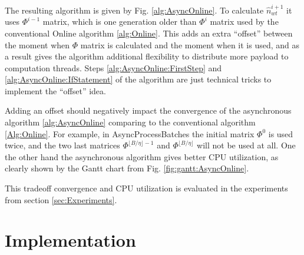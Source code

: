 \documentclass[russian,english]{llncs}
\newcommand{\kw}[1]{\textsf{#1}}
\begin{document}
The resulting algorithm is given by Fig. \ref{alg:AsyncOnline}.
To calculate $\hat n^{i+1}_{wt}$ it uses $\Phi^{i-1}$ matrix,
which is one generation older than $\Phi^{i}$ matrix used by the conventional \kw{Online algorithm} \ref{alg:Online}.
This adds an extra ``offset'' between the moment when $\Phi$ matrix is calculated and the moment when it is used,
and as a result gives the algorithm additional flexibility to distribute more payload to computation threads.
Steps \ref{alg:AsyncOnline:FirstStep} and \ref{alg:AsyncOnline:IfStatement} of the algorithm
are just technical tricks to implement the ``offset'' idea.

Adding an offset should negatively impact the convergence of the asynchronous algorithm \ref{alg:AsyncOnline}
comparing to the conventional algorithm \ref{Alg:Online}.
For example, in \kw{AsyncProcessBatches} the initial matrix $\Phi^0$ is used twice,
and the two last matrices $\Phi^{\lfloor B / \eta \rfloor - 1}$ and $\Phi^{\lfloor B / \eta \rfloor}$ will not be used at all.
One the other hand the asynchronous algorithm gives better CPU utilization,
as clearly shown by the Gantt chart from Fig. \ref{fig:gantt:AsyncOnline}.

This tradeoff convergence and CPU utilization is evaluated in the experiments from section \ref{sec:Experiments}.

\section{Implementation}
\label{sec:Architecture}
\end{document}
